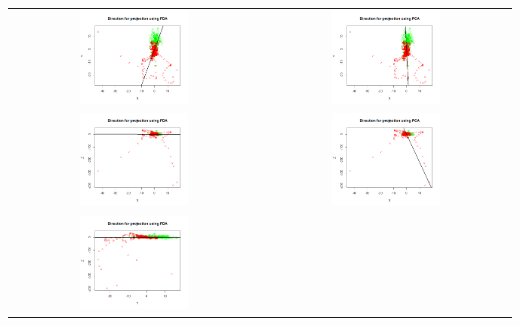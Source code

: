 \documentclass[a4paper]{article}
\begin{document}
\begin{longtable}{cc}
	\includegraphics[width=0.45\textwidth]{images/FDA_XY} &
	\includegraphics[width=0.45\textwidth]{images/PCA_XY} \\
	\includegraphics[width=0.45\textwidth]{images/FDA_XZ} &
	\includegraphics[width=0.45\textwidth]{images/PCA_XZ} \\
	\includegraphics[width=0.45\textwidth]{images/FDA_YZ} &

\end{longtable}
\end{document}
